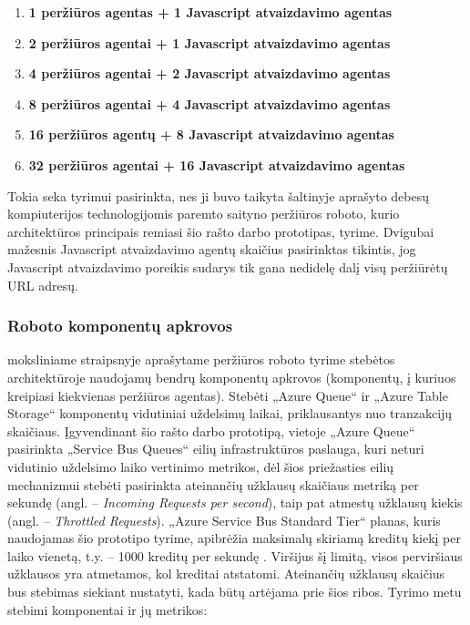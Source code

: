 \begin{enumerate}
    \item \textbf{ 1 peržiūros agentas + 1 Javascript atvaizdavimo agentas}
    \item \textbf{2 peržiūros agentai + 1 Javascript atvaizdavimo agentas}
    \item \textbf{4 peržiūros agentai + 2 Javascript atvaizdavimo agentas}
    \item \textbf{8 peržiūros agentai + 4 Javascript atvaizdavimo agentas}
    \item \textbf{16 peržiūros agentų + 8 Javascript atvaizdavimo agentas}
    \item \textbf{32 peržiūros agentai + 16 Javascript atvaizdavimo agentas}
\end{enumerate}

Tokia seka tyrimui pasirinkta, nes ji buvo taikyta \cite{MercedCloudBasedWebCrawler} šaltinyje aprašyto debesų kompiuterijos technologijomis paremto saityno peržiūros roboto, kurio architektūros principais remiasi šio rašto darbo prototipas, tyrime. Dvigubai mažesnis Javascript  atvaizdavimo agentų skaičius pasirinktas tikintis, jog Javascript atvaizdavimo poreikis sudarys tik gana nedidelę dalį visų peržiūrėtų URL adresų.

\subsubsection{Roboto komponentų apkrovos}

\cite{MercedCloudBasedWebCrawler} moksliniame straipsnyje aprašytame peržiūros roboto tyrime stebėtos architektūroje naudojamų bendrų komponentų apkrovos (komponentų, į kuriuos kreipiasi kiekvienas peržiūros agentas). Stebėti „Azure Queue“ ir „Azure Table Storage“ komponentų vidutiniai uždelsimų laikai, priklausantys nuo tranzakcijų skaičiaus. Įgyvendinant šio rašto darbo prototipą, vietoje „Azure Queue“ pasirinkta „Service Bus Queues“ eilių infrastruktūros paslauga, kuri neturi vidutinio uždelsimo laiko vertinimo metrikos, dėl šios priežasties eilių mechanizmui stebėti pasirinkta ateinančių užklausų skaičiaus metriką per sekundę (angl. -- \textit{Incoming Requests per second}), taip pat atmestų užklausų kiekis (angl. -- \textit{Throttled Requests}). „Azure Service Bus Standard Tier“ planas, kuris naudojamas šio prototipo tyrime, apibrėžia maksimalų skiriamą kreditų kiekį per laiko vienetą, t.y. -- 1000 kreditų per sekundę \cite{ServiceBusThrottlingOverview}. Viršijus šį limitą, visos perviršiaus užklausos yra atmetamos, kol kreditai atstatomi. Ateinančių užklausų skaičius bus stebimas siekiant nustatyti, kada būtų artėjama prie šios ribos. Tyrimo metu stebimi komponentai ir jų metrikos:

